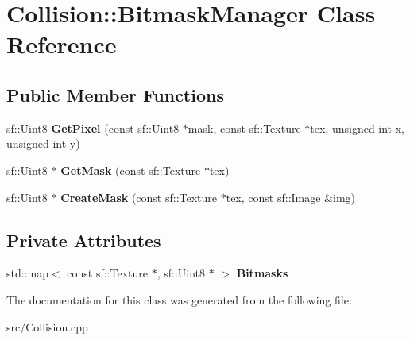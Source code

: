 \hypertarget{class_collision_1_1_bitmask_manager}{}\section{Collision\+::Bitmask\+Manager Class Reference}
\label{class_collision_1_1_bitmask_manager}
\subsection*{Public Member Functions}
\begin{DoxyCompactItemize}
\item 
\mbox{\label{class_collision_1_1_bitmask_manager_ae0bf2e9cc81ae50c0da7d383acb264b6}} 
sf\+::\+Uint8 {\bfseries Get\+Pixel} (const sf\+::\+Uint8 $\ast$mask, const sf\+::\+Texture $\ast$tex, unsigned int x, unsigned int y)
\item 
\mbox{\label{class_collision_1_1_bitmask_manager_a6da15023c27785497cee1460dd9f8414}} 
sf\+::\+Uint8 $\ast$ {\bfseries Get\+Mask} (const sf\+::\+Texture $\ast$tex)
\item 
\mbox{\label{class_collision_1_1_bitmask_manager_ab7e2582599c79d8a4e8d603515ed95f8}} 
sf\+::\+Uint8 $\ast$ {\bfseries Create\+Mask} (const sf\+::\+Texture $\ast$tex, const sf\+::\+Image \&img)
\end{DoxyCompactItemize}
\subsection*{Private Attributes}
\begin{DoxyCompactItemize}
\item 
\mbox{\label{class_collision_1_1_bitmask_manager_afad8238694514d2181a64f3b7d2578bf}} 
std\+::map$<$ const sf\+::\+Texture $\ast$, sf\+::\+Uint8 $\ast$ $>$ {\bfseries Bitmasks}
\end{DoxyCompactItemize}


The documentation for this class was generated from the following file\+:\begin{DoxyCompactItemize}
\item 
src/Collision.\+cpp\end{DoxyCompactItemize}
